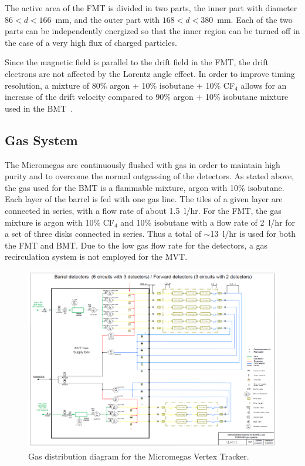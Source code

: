 The active area of the FMT is divided in two parts, the inner part with diameter $86 < d < 166$~mm, and the outer part with
$168 < d < 380$~mm. Each of the two parts can be independently energized so that the inner region can be turned off in the
case of a very high flux of charged particles.

Since the magnetic field is parallel to the drift field in the FMT, the drift electrons are not affected by the Lorentz angle
effect. In order to improve timing resolution, a mixture of 80\% argon + 10\% isobutane + 10\% CF$_4$ allows for an increase
of the drift velocity compared to 90\% argon + 10\% isobutane mixture used in the BMT~\cite{GAS}. 

\subsection{Gas System}

The Micromegas are continuously flushed with gas in order to maintain high purity and to overcome the normal outgassing of the
detectors. As stated above, the gas used for the BMT is a flammable mixture, argon with 10\% isobutane. Each layer of the
barrel is fed with one gas line. The tiles of a given layer are connected in series, with a flow rate of about 1.5~l/hr. For the FMT,
the gas mixture is argon with 10\% CF$_4$ and 10\% isobutane with a flow rate of 2~l/hr for a set of three disks connected
in series. Thus a total of $\sim$13~l/hr is used for both the FMT and BMT. Due to the low gas flow rate for the detectors, a gas
recirculation system is not employed for the MVT. 

\begin{figure}[htb]
\includegraphics[width=2\columnwidth,keepaspectratio]{images/gas_system}
 \caption{Gas distribution diagram for the Micromegas Vertex Tracker.}
 \label{fig:mm-gas-sys}
\end{figure}

